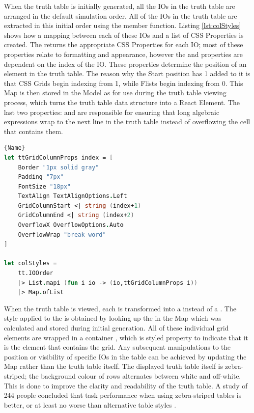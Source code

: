 When the truth table is initially generated, all the IOs in the truth table are arranged in the default simulation order. All of the IOs in the truth table are extracted in this initial order using the  member function. Listing \ref{lst:colStyles} shows how a mapping between each of these IOs and a list of CSS Properties is created. The  returns the appropriate CSS Properties for each IO; most of these properties relate to formatting and appearance, however the  and  properties are dependent on the index of the IO. These properties determine the position of an element in the truth table. The reason why the Start position has 1 added to it is that CSS Grids begin indexing from 1, while F\fsharp lists begin indexing from 0. This Map is then stored in the Model as  for use during the truth table viewing process, which turns the truth table data structure into a React Element. The last two properties:  and  are responsible for ensuring that long algebraic expressions wrap to the next line in the truth table instead of overflowing the cell that contains them.
\begin{lstlisting}[caption=Generating CSS Properties for each IO,frame=tlrb, language=FSharp, label=lst:colStyles]{Name}
let ttGridColumnProps index = [
    Border "1px solid gray"
    Padding "7px"
    FontSize "18px"
    TextAlign TextAlignOptions.Left
    GridColumnStart <| string (index+1)
    GridColumnEnd <| string (index+2)
    OverflowX OverflowOptions.Auto
    OverflowWrap "break-word"
]

let colStyles = 
    tt.IOOrder
    |> List.mapi (fun i io -> (io,ttGridColumnProps i))
    |> Map.ofList 
\end{lstlisting}

When the truth table is viewed, each  is transformed into a  instead of a . The style applied to the  is obtained by looking up the  in the  Map which was calculated and stored during initial generation. All of these individual grid elements are wrapped in a container , which is styled property  to indicate that it is the element that contains the grid. Any subsequent manipulations to the position or visibility of specific IOs in the table can be achieved by updating the  Map rather than the truth table itself. The displayed truth table itself is zebra-striped; the background colour of rows alternates between white and off-white. This is done to improve the clarity and readability of the truth table. A study of 244 people concluded that task performance when using zebra-striped tables is better, or at least no worse than alternative table styles \cite{zebrastripes}.

